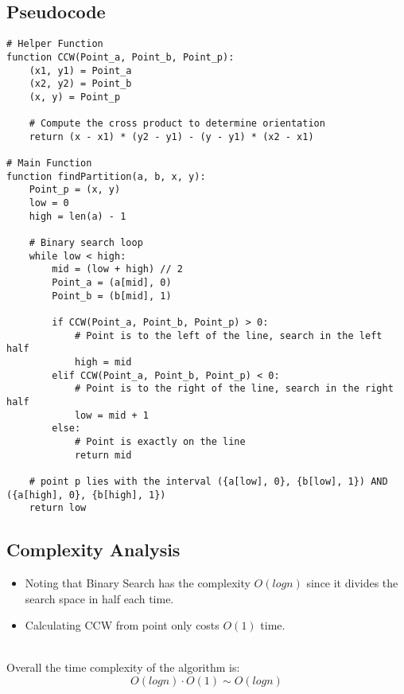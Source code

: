\documentclass{article}
\begin{document}
\subsection*{Pseudocode}
\begin{verbatim}
# Helper Function
function CCW(Point_a, Point_b, Point_p):
    (x1, y1) = Point_a
    (x2, y2) = Point_b
    (x, y) = Point_p

    # Compute the cross product to determine orientation
    return (x - x1) * (y2 - y1) - (y - y1) * (x2 - x1)

# Main Function
function findPartition(a, b, x, y):
    Point_p = (x, y)
    low = 0
    high = len(a) - 1

    # Binary search loop
    while low < high:
        mid = (low + high) // 2
        Point_a = (a[mid], 0)
        Point_b = (b[mid], 1)

        if CCW(Point_a, Point_b, Point_p) > 0:
            # Point is to the left of the line, search in the left half
            high = mid
        elif CCW(Point_a, Point_b, Point_p) < 0:
            # Point is to the right of the line, search in the right half
            low = mid + 1
        else:
            # Point is exactly on the line
            return mid

    # point p lies with the interval ({a[low], 0}, {b[low], 1}) AND ({a[high], 0}, {b[high], 1})
    return low 

\end{verbatim}

\subsection*{Complexity Analysis}
\begin{itemize}
    \item Noting that Binary Search has the complexity $O(logn)$ since it divides the search space in half each time.
    \item Calculating CCW from point only costs $O(1)$ time.
\end{itemize}
\\
Overall the time complexity of the algorithm is:
\[ O(logn) \cdot O(1) \sim O(logn) \]
\end{document}
